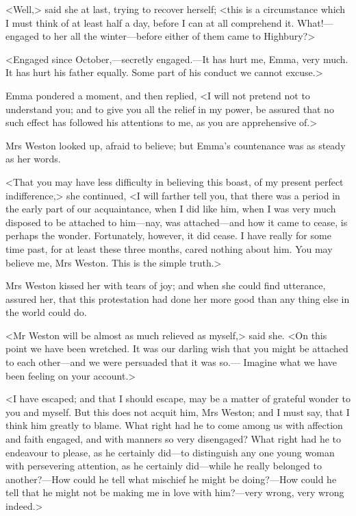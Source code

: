 <Well,> said she at last, trying to recover herself; <this is a circumstance which I must think of at least half a day, before I can at all comprehend it. What!—engaged to her all the winter—before either of them came to Highbury?>

<Engaged since October,—secretly engaged.—It has hurt me, Emma, very much. It has hurt his father equally. Some part of his conduct we cannot excuse.>

Emma pondered a moment, and then replied, <I will not pretend not to understand you; and to give you all the relief in my power, be assured that no such effect has followed his attentions to me, as you are apprehensive of.>

Mrs Weston looked up, afraid to believe; but Emma's countenance was as steady as her words.

<That you may have less difficulty in believing this boast, of my present perfect indifference,> she continued, <I will farther tell you, that there was a period in the early part of our acquaintance, when I did like him, when I was very much disposed to be attached to him—nay, was attached—and how it came to cease, is perhaps the wonder. Fortunately, however, it did cease. I have really for some time past, for at least these three months, cared nothing about him. You may believe me, Mrs Weston. This is the simple truth.>

Mrs Weston kissed her with tears of joy; and when she could find utterance, assured her, that this protestation had done her more good than any thing else in the world could do.

<Mr Weston will be almost as much relieved as myself,> said she. <On this point we have been wretched. It was our darling wish that you might be attached to each other—and we were persuaded that it was so.— Imagine what we have been feeling on your account.>

<I have escaped; and that I should escape, may be a matter of grateful wonder to you and myself. But this does not acquit him, Mrs Weston; and I must say, that I think him greatly to blame. What right had he to come among us with affection and faith engaged, and with manners so very disengaged? What right had he to endeavour to please, as he certainly did—to distinguish any one young woman with persevering attention, as he certainly did—while he really belonged to another?—How could he tell what mischief he might be doing?—How could he tell that he might not be making me in love with him?—very wrong, very wrong indeed.>

